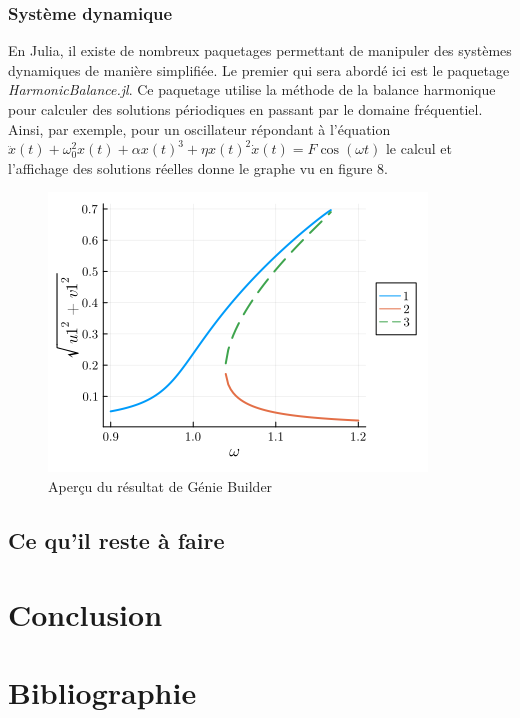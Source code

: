 \documentclass[a4paper, french, 12pt, titlepage]{article}
\begin{document}
\subsubsection{Système dynamique}

En Julia, il existe de nombreux paquetages permettant de manipuler des systèmes dynamiques de manière simplifiée. Le premier qui sera abordé ici est le paquetage \emph{HarmonicBalance.jl}. Ce paquetage utilise la méthode de la balance harmonique pour calculer des solutions périodiques en passant par le domaine fréquentiel. Ainsi, par exemple, pour un oscillateur répondant à l'équation $\ddot x(t) + \omega_0^2 x(t) + \alpha x(t)^3 + \eta x(t)^2 \dot x (t) = F \cos(\omega t)$ le calcul et l'affichage des solutions réelles donne le graphe vu en figure 8. \\

\begin{center}
\begin{figure}[htb]
  \includegraphics[width=0.7\linewidth]{harmonicbalance.png}
  \caption{Aperçu du résultat de Génie Builder}
  \label{fig:organigramme}
\end{figure}

\end{center}

\subsection{Ce qu'il reste à faire}

\newpage 

\section*{Conclusion}


\newpage 

\section*{Bibliographie}
\end{document}
